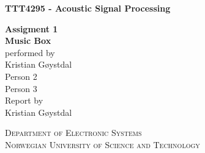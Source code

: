 \documentclass[english]{report}
\begin{document}
\pagestyle{empty} %
\newcommand{\HRule}{\rule{\linewidth}{1mm}}
\begin{center}
\end{center}

\begin{center}
\textbf {TTT4295 - Acoustic Signal Processing}
\end{center}


\begin{center}
  \large
  \textbf{Assigment 1}\\
  \huge
  \textbf{Music Box\\}
  \small
  \noindent performed by \\
  \large
  \noindent Kristian Gøystdal\\Person 2\\Person 3\\
  \small
  \noindent Report by \\
  \large
  \noindent Kristian Gøystdal\\
\end{center}

\begin{center}
\textsc{Department of Electronic Systems}\\
\textsc{Norwegian University of Science and Technology}
\end{center}

\cleardoublepage
{} 


\cleardoublepage
{}
\pagestyle{plain}



\tableofcontents
\cleardoublepage
{}










\appendix


\end{document}
